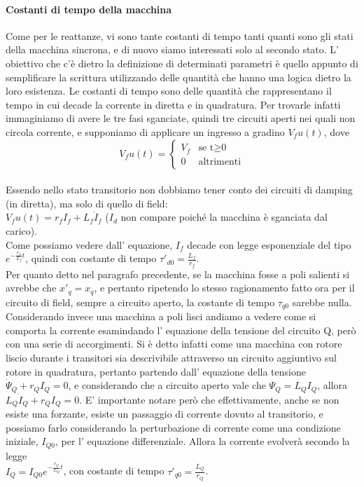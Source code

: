 \documentclass[Lau,noexaminfo]{sapthesis}
\begin{document}
	\paragraph{Costanti di tempo della macchina}
	Come per le reattanze, vi sono tante costanti di tempo tanti quanti sono gli stati della macchina sincrona, e di nuovo siamo interessati solo al secondo stato. L' obiettivo che c'è dietro la definizione di determinati parametri è quello appunto di semplificare la scrittura utilizzando delle quantità che hanno una logica dietro la loro esistenza. Le costanti di tempo sono delle quantità che rappresentano il tempo in cui decade la corrente in diretta e in quadratura. Per trovarle infatti immaginiamo di avere le tre fasi sganciate, quindi tre circuiti aperti nei quali non circola corrente, e supponiamo di applicare un ingresso a gradino $V_fu(t)$, dove\\
	\[
	V_fu(t)=
	\begin{cases}
	V_f	& \text{se t$\ge$0}\\
	0	& \text{altrimenti}
	\end{cases}
	\]\\ Essendo nello stato transitorio non dobbiamo tener conto dei circuiti di damping (in diretta), ma solo di quello di field:\\
	$V_fu(t)=r_fI_f+L_f\dot{I}_f$ ($I_d$ non compare poiché la macchina è sganciata dal carico).\\
	Come possiamo vedere dall' equazione, $I_f$ decade con legge esponenziale del tipo $e^{-\frac{r_f}{L_f}t}$, quindi con costante di tempo $\tau'_{d0}=\frac{L_f}{r_f}$.\\
	Per quanto detto nel paragrafo precedente, se la macchina fosse a poli salienti si avrebbe che $x'_q=x_q$, e pertanto ripetendo lo stesso ragionamento fatto ora per il circuito di field, sempre a circuito aperto, la costante di tempo $\tau_{q0}$ sarebbe nulla. Considerando invece una macchina a poli lisci andiamo a vedere come si comporta la corrente esamindando l' equazione della tensione del circuito Q, però con una serie di accorgimenti. Si è detto infatti come una macchina con rotore liscio durante i transitori sia descrivibile attraverso un circuito aggiuntivo sul rotore in quadratura, pertanto partendo dall' equazione della tensione $\dot{\Psi}_Q+r_QI_Q=0$, e considerando che a circuito aperto vale che $\Psi_Q=L_QI_Q$,
	allora $L_Q\dot{I}_Q+r_QI_Q=0$. E' importante notare però che effettivamente, anche se non esiste una forzante, esiste un passaggio di corrente dovuto al transitorio, e possiamo farlo considerando la perturbazione di corrente come una condizione iniziale, $I_{Q0}$, per l' equazione differenziale. Allora la corrente evolverà secondo la legge\\
	$I_Q=I_{Q0}e^{-\frac{r_Q}{L_Q}t}$, con costante di tempo $\tau'_{q0}=\frac{L_Q}{r_Q}$.
	
\end{document}
